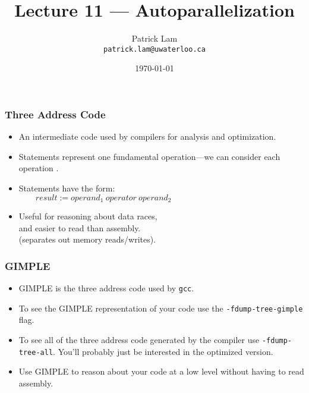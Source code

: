 

\title{Lecture 11 --- Autoparallelization }

\author{Patrick Lam \\ \small \texttt{patrick.lam@uwaterloo.ca}}
\date{\today}




\begin{frame}
  \titlepage

 \end{frame}
 
\begin{frame}
  \frametitle{Three Address Code}

  
  \begin{itemize}
    \item An intermediate code used by compilers
      for analysis and optimization.
    \vfill
    \item Statements represent one fundamental operation---we
      can consider each operation .
    \vfill
    \item Statements have the form:\\
      $\qquad result := operand_1\:operator\:operand_2$
    \vfill
    \item Useful for reasoning about data races,\\ and easier to read than assembly. \\
            \hspace*{1cm} (separates out memory reads/writes).
  \end{itemize}
  
\end{frame}

\begin{frame}
  \frametitle{GIMPLE}

  
  \begin{itemize}
    \item GIMPLE is the three address code used by {\tt gcc}.
    \vfill
    \item To see the GIMPLE representation of your code use the
      {\tt -fdump-tree-gimple} flag.
    \vfill
    \item To see all of the three address code generated by the compiler use
      {\tt -fdump-tree-all}. You'll probably just be interested in the
      optimized version.
    \vfill
    \item Use GIMPLE to reason about your code at a low level without
      having to read assembly.
  \end{itemize}
  
\end{frame}


